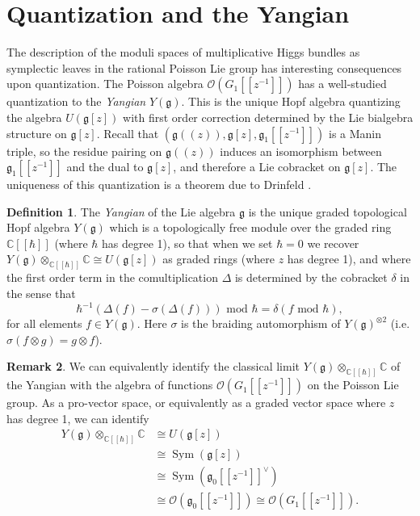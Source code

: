 \documentclass[11pt, oneside, reqno]{amsart}
\theoremstyle{definition} \newtheorem{definition}{Definition}[section]
\theoremstyle{definition} \newtheorem{remark}[definition]{Remark}
\theoremstyle{definition} \newtheorem{remarks}[definition]{Remarks}
\theoremstyle{definition} \newtheorem{question}[definition]{Question}
\theoremstyle{definition} \newtheorem*{note}{Note}
\theoremstyle{definition} \newtheorem{example}[definition]{Example}
\theoremstyle{definition} \newtheorem{examples}[definition]{Examples}
\renewcommand{\gg}{\mathfrak{g}}
\newcommand{\CC}{\mathbb{C}}
\newcommand{\OO}{\mathcal{O}}
\newcommand{\iso}{\cong}
\DeclareMathOperator{\sym}{Sym}
\begin{document}
\section{Quantization and the Yangian} \label{quantization_section}

The description of the moduli spaces of multiplicative Higgs bundles as symplectic leaves in the rational Poisson Lie group has interesting consequences upon quantization.  The Poisson algebra $\OO(G_1[[z^{-1}]])$ has a well-studied quantization to the \emph{Yangian} $Y(\gg)$.  This is the unique Hopf algebra quantizing the algebra $U(\gg[z])$ with first order correction determined by the Lie bialgebra structure on $\gg[z]$.  Recall that $(\gg(\!(z)\!), \gg[z], \gg_1[[z^{-1}]])$ is a Manin triple, so the residue pairing on $\gg(\!(z)\!)$ induces an isomorphism between $\gg_1[[z^{-1}]]$ and the dual to $\gg[z]$, and therefore a Lie cobracket on $\gg[z]$.  The uniqueness of this quantization is a theorem due to Drinfeld {\cite[Theorem 2]{DrinfeldQuantum1}}.

\begin{definition}
The \emph{Yangian} of the Lie algebra $\gg$ is the unique graded topological Hopf algebra $Y(\gg)$ which is a topologically free module over the graded ring $\CC[[\hbar]]$ (where $\hbar$ has degree 1), so that when we set $\hbar=0$ we recover $Y(\gg) \otimes_{\CC[[\hbar]]} \CC \iso U(\gg[z])$ as graded rings (where $z$ has degree 1), and where the first order term in the comultiplication $\Delta$ is determined by the cobracket $\delta$ in the sense that
\[\hbar^{-1}(\Delta(f) - \sigma(\Delta(f))) \text{ mod } \hbar = \delta(f \text{ mod } \hbar),\]
for all elements $f \in Y(\gg)$.  Here $\sigma$ is the braiding automorphism of $Y(\gg)^{\otimes 2}$ (i.e. $\sigma(f \otimes g) = g \otimes f$).
\end{definition}

\begin{remark}
We can equivalently identify the classical limit $Y(\gg) \otimes_{\CC[[\hbar]]} \CC$ of the Yangian with the algebra of functions $\OO(G_1[[z^{-1}]])$ on the Poisson Lie group.  As a pro-vector space, or equivalently as a graded vector space where $z$ has degree 1, we can identify
\begin{align*}
Y(\gg) \otimes_{\CC[[\hbar]]} \CC &\iso U(\gg[z]) \\
&\iso \sym(\gg[z]) \\
&\iso \sym(\gg_0[[z^{-1}]]^\vee) \\
&\iso \OO(\gg_0[[z^{-1}]]) \iso \OO(G_1[[z^{-1}]]).
\end{align*}
\end{remark}
\end{document}

